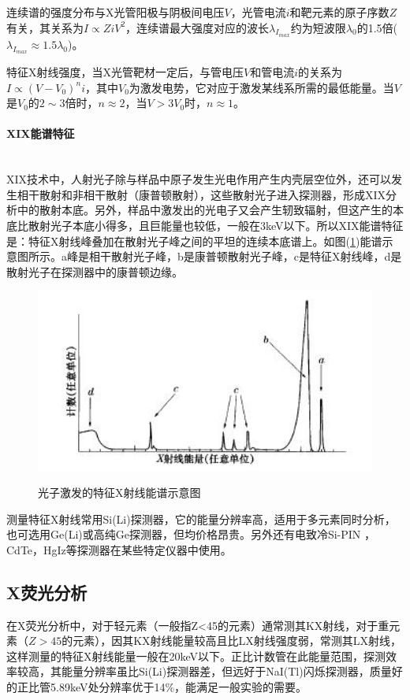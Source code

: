 \documentclass[a4paper]{article}
\begin{document}
连续谱的强度分布与X光管阳极与阴极间电压$ V $，光管电流$ i $和靶元素的原子序数$ Z $有关，其关系为$I\propto ZiV^2$，连续谱最大强度对应的波长$\lambda_{I_{max}}$约为短波限$\lambda_0$的1.5倍($\lambda_{I_{max}}\approx 1.5\lambda_0$)。

特征X射线强度，当X光管靶材一定后，与管电压$ V $和管电流$ i $的关系为$ I \propto (V-V_0)^n i  $，其中$V_0$为激发电势，它对应于激发某线系所需的最低能量。当$ V $是$V_0$的$ 2\sim 3 $倍时，$ n\approx 2 $，当$V > 3V_0$时，$n\approx 1$。

\paragraph{XIX能谱特征}~\\
XIX技术中，人射光子除与样品中原子发生光电作用产生内壳层空位外，还可以发生相干散射和非相干散射（康普顿散射），这些散射光子进入探测器，形成XIX分析中的散射本底。另外，样品中激发出的光电子又会产生轫致辐射，但这产生的本底比散射光子本底小得多，且巨能量也较低，一般在3keV以下。所以XIX能谱特征是：特征X射线峰叠加在散射光子峰之间的平坦的连续本底谱上。如图(\ref{5})能谱示意图所示。a峰是相干散射光子峰，b是康普顿散射光子峰，c是特征X射线峰，d是散射光子在探测器中的康普顿边缘。
\begin{figure}[H]
\centering
\includegraphics[width=12cm]{fig/5.jpg}\\
\caption{光子激发的特征X射线能谱示意图}\label{5}
\end{figure}
测量特征X射线常用Si(Li)探测器，它的能量分辨率高，适用于多元素同时分析，也可选用Ge(Li)或高纯Ge探测器，但均价格昂贵。另外还有电致冷Si-PIN ，CdTe，HgIz等探测器在某些特定仪器中使用。

\subsection{X荧光分析}
在X荧光分析中，对于轻元素（一般指Z<45的元素）通常测其KX射线，对于重元素（$ Z>45 $的元素），因其KX射线能量较高且比LX射线强度弱，常测其LX射线，这样测量的特征X射线能量一般在20keV以下。正比计数管在此能量范围，探测效率较高，其能量分辨率虽比Si(Li)探测器差，但远好于NaI(Tl)闪烁探测器，质量好的正比管5.89keV处分辨率优于14\%，能满足一般实验的需要。
\end{document}
